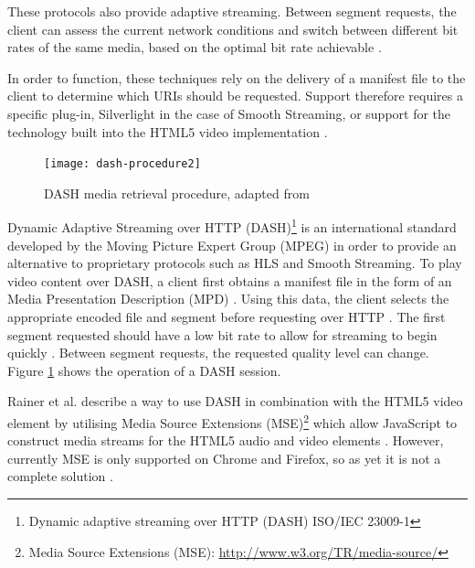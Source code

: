\documentclass[journal]{IEEEtran}
\begin{document}
These protocols also provide adaptive streaming. Between segment requests, the client can assess the current network conditions and switch between different bit rates of the same media, based on the optimal bit rate achievable \cite{article:areWeInTheMiddleOfAVideoStreamingRevolution}.

In order to function, these techniques rely on the delivery of a manifest file to the client to determine which URIs should be requested. %
Support therefore requires a specific plug-in, Silverlight in the case of Smooth Streaming, or support for the technology built into the HTML5 video implementation \cite{inproceedings:aSeamlessIntegrationOfAdaptiveHTTPStreaming}. %

\begin{figure}[!t]
\centering
\texttt{[image: dash-procedure2]}
\caption{DASH media retrieval procedure, adapted from  \cite{inproceedings:dynamicAdapativeHTTPStreamingLive}}
\label{fig:dashProcedure}
\end{figure} 

Dynamic Adaptive Streaming over HTTP (DASH)\footnote{Dynamic
adaptive streaming over HTTP (DASH) ISO/IEC 23009-1} is an international standard developed by the Moving Picture Expert Group (MPEG) in order to provide an alternative to proprietary protocols such as HLS and Smooth Streaming. To play video content over DASH, a client first obtains a manifest file in the form of an Media Presentation Description (MPD) \cite{article:MPEGDASH}. Using this data, the client selects the appropriate encoded file and segment before requesting over HTTP \cite{article:MPEGDASH}. The first segment requested should have a low bit rate to allow for streaming to begin quickly \cite{inproceedings:dynamicAdapativeHTTPStreamingLive}. Between segment requests, the requested quality level can change. Figure \ref{fig:dashProcedure} shows the operation of a DASH session.

Rainer et al. describe a way to use DASH in combination with the HTML5 video element by utilising Media Source Extensions (MSE)\footnote{Media Source Extensions (MSE): \url{http://www.w3.org/TR/media-source/}} which allow JavaScript to construct media streams for the HTML5 audio and video elements \cite{standard:mse} \cite{inproceedings:aSeamlessIntegrationOfAdaptiveHTTPStreaming}. However, currently MSE is only supported on Chrome and Firefox, so as yet it is not a complete solution \cite{website:mdnMediaSource}.
\end{document}
